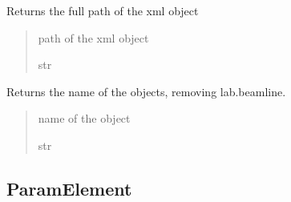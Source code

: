 \documentclass[letterpaper,10pt,english]{sphinxmanual}
\begin{document}
\begin{fulllineitems}
\begin{fulllineitems}
\end{fulllineitems}


\begin{fulllineitems}
\label{\detokenize{API:raypyng.rml.ObjectElement.get_full_path}}
\pysigstartsignatures
{}
\pysigstopsignatures
\sphinxAtStartPar
Returns the full path of the xml object
\begin{quote}\begin{description}
\sphinxAtStartPar
path of the xml object

\sphinxAtStartPar
str

\end{description}\end{quote}

\end{fulllineitems}


\begin{fulllineitems}
\label{\detokenize{API:raypyng.rml.ObjectElement.resolvable_name}}
\pysigstartsignatures
{}
\pysigstopsignatures
\sphinxAtStartPar
Returns the name of the objects, removing lab.beamline.
\begin{quote}\begin{description}
\sphinxAtStartPar
name of the object

\sphinxAtStartPar
str

\end{description}\end{quote}

\end{fulllineitems}


\end{fulllineitems}



\subsection{ParamElement}
\label{\detokenize{API:paramelement}}
\end{document}
